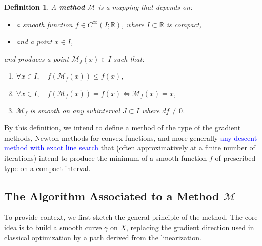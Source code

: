 \documentclass{amsart}
\newcommand{\minor}[1]{\textcolor{blue}{#1}}
\newcounter{thm}
\newcounter{ex}
\newcounter{re}
\newtheorem{Definition}[thm]{Definition}
\begin{document}
\begin{Definition} \label{d:method}
	A \textbf{method} $\mathcal{M}$ is a mapping that depends on:
	\begin{itemize}
		\item a smooth function $f \in C^\infty(I; \mathbb{R})$, where $I \subset \mathbb{R}$ is compact,
		\item and a point $x \in I$,
	\end{itemize}
	and produces a point $\mathcal{M}_f(x) \in I$ such that:
	\begin{enumerate}
		\item $\forall x \in I,\quad f(\mathcal{M}_f(x)) \leq f(x)$,
		\item $\forall x \in I,\quad f(\mathcal{M}_f(x)) = f(x) \iff \mathcal{M}_f(x) = x$,
		\item \label{iii-method} $\mathcal{M}_f$ is smooth on any subinterval $J \subset I$ where $df \neq 0$.
	\end{enumerate}
\end{Definition}


By this definition, we intend to define a method of the type of the gradient methods, Newton methods for convex functions, and more generally \minor{any descent method with exact line search} that (often approximatively at a finite number of iterations) intend to produce the minimum of a smooth function $f$ of prescribed type on a compact interval.  
\subsection{The Algorithm Associated to a Method $\mathcal{M}$}

To provide context, we first sketch the general principle of the method. The core idea is to build a smooth curve $\gamma$ on $X$, replacing the gradient direction used in classical optimization by a path derived from the linearization.
\end{document}
